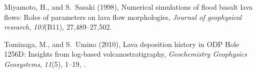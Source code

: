 \documentclass[aguposter,landscape]{baposter}
\begin{document}
\begin{poster}
{\begin{center}
\begin{minipage}[t]{0.93\linewidth}
\begin{multicols}{2}
\begin{thebibliography}{7}
Miyamoto, H., and S.~Sasaki (1998), {Numerical simulations of flood basalt lava
  flows: Roles of parameters on lava flow morphologies}, \textit{Journal of
  geophysical research}, \textit{103}(B11), 27,489--27,502.

Tominaga, M., and S.~Umino (2010), {Lava deposition history in ODP Hole 1256D:
  Insights from log-based volcanostratigraphy}, \textit{Geochemistry Geophysics
  Geosystems}, \textit{11}(5), 1--19, .

\end{thebibliography}

   

    \end{multicols}
  \end{minipage}
  \end{center}

  }

\end{poster}%
%
\end{document}
